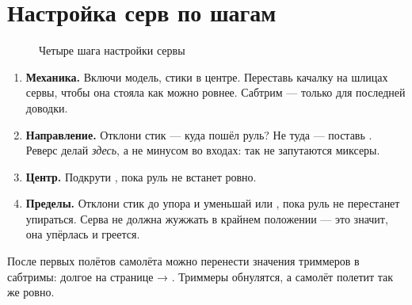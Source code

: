 \section{Настройка серв по шагам}

\begin{figure}[H]
\centering
{}
\caption{Четыре шага настройки сервы}
\end{figure}

\begin{enumerate}
  \item \textbf{Механика.} Включи модель, стики в центре. Переставь качалку на шлицах сервы,
        чтобы она стояла как можно ровнее. Сабтрим --- только для последней доводки.
  \item \textbf{Направление.} Отклони стик --- куда пошёл руль? Не туда --- поставь .
        Реверс делай \emph{здесь}, а не минусом во входах: так не запутаются миксеры.
  \item \textbf{Центр.} Подкрути , пока руль не встанет ровно.
  \item \textbf{Пределы.} Отклони стик до упора и уменьшай  или , пока
        руль не перестанет упираться. Серва не должна жужжать в крайнем положении ---
        это значит, она упёрлась и греется.
\end{enumerate}

\begin{tip}
После первых полётов самолёта можно перенести значения триммеров в сабтримы: долгое
 на странице  → . Триммеры обнулятся,
а самолёт полетит так же ровно.
\end{tip}

